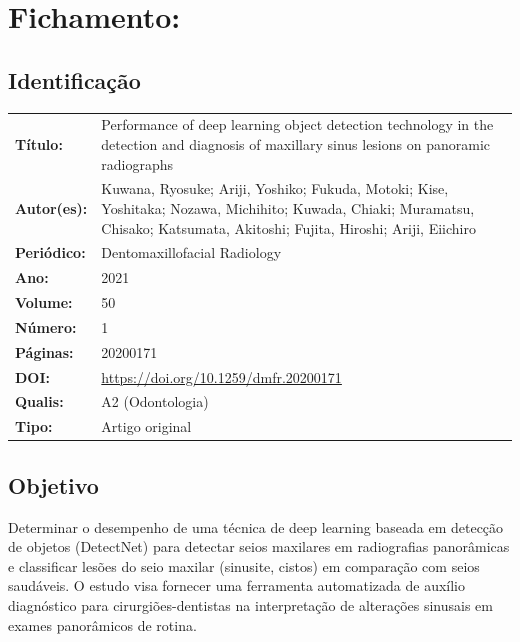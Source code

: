 \section{Fichamento: }

\subsection{Identificação}
\begin{tabular}{ll}
\textbf{Título:} & Performance of deep learning object detection technology in the
detection and diagnosis of maxillary sinus lesions on panoramic radiographs \\
\textbf{Autor(es):} & Kuwana, Ryosuke; Ariji, Yoshiko; Fukuda, Motoki; Kise,
Yoshitaka; Nozawa, Michihito; Kuwada, Chiaki; Muramatsu, Chisako; Katsumata,
Akitoshi; Fujita, Hiroshi; Ariji, Eiichiro \\
\textbf{Periódico:} & Dentomaxillofacial Radiology \\
\textbf{Ano:} & 2021 \\
\textbf{Volume:} & 50 \\
\textbf{Número:} & 1 \\
\textbf{Páginas:} & 20200171 \\
\textbf{DOI:} & \url{https://doi.org/10.1259/dmfr.20200171} \\
\textbf{Qualis:} & A2 (Odontologia) \\
\textbf{Tipo:} & Artigo original \\
\end{tabular}

\subsection{Objetivo}
Determinar o desempenho de uma técnica de deep learning baseada em detecção de
objetos (DetectNet) para detectar seios maxilares em radiografias panorâmicas e
classificar lesões do seio maxilar (sinusite, cistos) em comparação com seios
saudáveis. O estudo visa fornecer uma ferramenta automatizada de auxílio
diagnóstico para cirurgiões-dentistas na interpretação de alterações
sinusais em exames panorâmicos de rotina.

